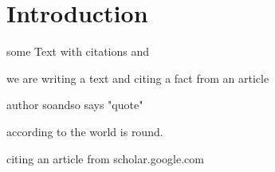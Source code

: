 \documentclass[12pt,a4paper]{article}
\begin{document}
\section{Introduction}

some Text with citations \citet{example} and \citep{buch1}

we are writing a text and citing a fact from an article \citep{reilly2003science}

author soandso says "quote" \citep{example}

according to \citet{example} the world is round.

citing an article from scholar.google.com \citep{reilly2003science}






\newpage

\printbibliography
\end{document}

